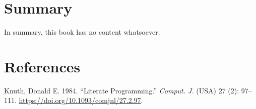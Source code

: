 \documentclass[
  letterpaper,
  DIV=11,
  numbers=noendperiod]{scrreprt}
\newlength{\cslhangindent}
\newenvironment{CSLReferences}[2] %
 {\begin{list}{}{%
  \setlength{\itemindent}{0pt}
  \setlength{\leftmargin}{0pt}
  \setlength{\parsep}{0pt}
  \ifodd #1
   \setlength{\leftmargin}{\cslhangindent}
   \setlength{\itemindent}{-1\cslhangindent}
  \fi
  \setlength{\itemsep}{#2\baselineskip}}}
 {\end{list}}
\begin{document}

\chapter{Summary}\label{summary}

In summary, this book has no content whatsoever.


\chapter*{References}\label{references}


\protect{}\label{refs}
\begin{CSLReferences}{1}{1}
Knuth, Donald E. 1984. {``Literate Programming.''} \emph{Comput. J.}
(USA) 27 (2): 97--111. \url{https://doi.org/10.1093/comjnl/27.2.97}.

\end{CSLReferences}
\end{document}

